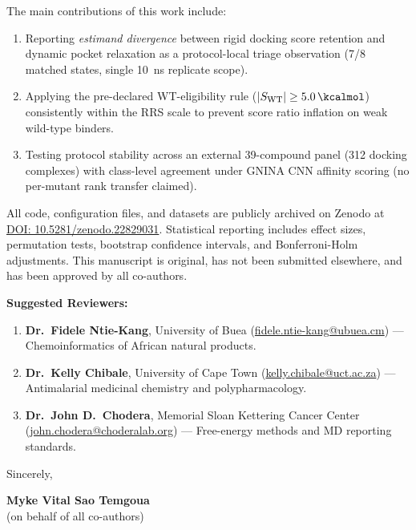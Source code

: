 \documentclass[11pt,letterpaper]{article}
\begin{document}
The main contributions of this work include:
\begin{enumerate}
  \item Reporting \textit{estimand divergence} between rigid docking score retention and dynamic pocket relaxation as a protocol-local triage observation (7/8 matched states, single \qty{10}{\ns} replicate scope).
  \item Applying the pre-declared WT-eligibility rule ($|S_{\mathrm{WT}}| \ge \qty{5.0}{\kcalmol}$) consistently within the RRS scale to prevent score ratio inflation on weak wild-type binders.
  \item Testing protocol stability across an external 39-compound panel (\num{312} docking complexes) with class-level agreement under GNINA CNN affinity scoring (no per-mutant rank transfer claimed).
\end{enumerate}

All code, configuration files, and datasets are publicly archived on Zenodo at \href{https://doi.org/10.5281/zenodo.22829031}{DOI: 10.5281/zenodo.22829031}. Statistical reporting includes effect sizes, permutation tests, bootstrap confidence intervals, and Bonferroni-Holm adjustments. This manuscript is original, has not been submitted elsewhere, and has been approved by all co-authors.

\vspace{0.4em}
\noindent\textbf{Suggested Reviewers:}
\begin{enumerate}
  \item \textbf{Dr.\ Fidele Ntie-Kang}, University of Buea (\href{mailto:fidele.ntie-kang@ubuea.cm}{fidele.ntie-kang@ubuea.cm}) --- Chemoinformatics of African natural products.
  \item \textbf{Dr.\ Kelly Chibale}, University of Cape Town (\href{mailto:kelly.chibale@uct.ac.za}{kelly.chibale@uct.ac.za}) --- Antimalarial medicinal chemistry and polypharmacology.
  \item \textbf{Dr.\ John D.\ Chodera}, Memorial Sloan Kettering Cancer Center (\href{mailto:john.chodera@choderalab.org}{john.chodera@choderalab.org}) --- Free-energy methods and MD reporting standards.
\end{enumerate}

\vspace{0.4em}
\noindent Sincerely,

\vspace{0.8em}

\noindent \textbf{Myke Vital Sao Temgoua} \\
(on behalf of all co-authors)
\end{document}
